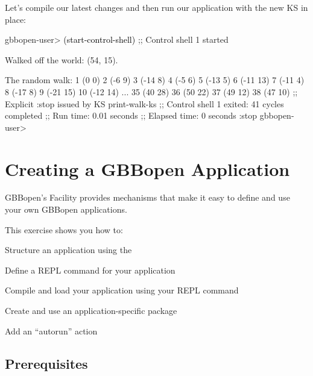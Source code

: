 \documentclass[10pt,twoside,english,pdftex]{article}
\begin{document}
Let's compile our latest changes and then run our application with the new
 KS in place:
%
\W\supp
\begin{example}
\textcolor{darkergray}{%
  gbbopen-user> \textcolor{black}{(start-control-shell)}
  ;; Control shell 1 started

  Walked off the world: (54, 15).

  The random walk:
  1 (0 0)
  2 (-6 9)
  3 (-14 8)
  4 (-5 6)
  5 (-13 5)
  6 (-11 13)
  7 (-11 4)
  8 (-17 8)
  9 (-21 15)
  10 (-12 14)
       ...
  35 (40 28)
  36 (50 22)
  37 (49 12)
  38 (47 10)
  ;; Explicit :stop issued by KS print-walk-ks
  ;; Control shell 1 exited: 41 cycles completed
  ;; Run time: 0.01 seconds
  ;; Elapsed time: 0 seconds
  :stop
  gbbopen-user>}
\end{example}


\T\markright{}%
\T\pagestyle{plain}
\T\cleardoublepage
\W{}
\T\pagestyle{fancy}
\T\thispagestyle{fancybottom}
\T\renewcommand{\headrulewidth}{0pt}
\section{Creating a GBBopen Application}
\label{sec:application}%

GBBopen's  Facility provides
mechanisms that make it easy to define and use your own GBBopen applications.

\fndocrule

This exercise shows you how to:
\begin{tightitemize}
\item Structure an application using the 
\item Define a REPL command for your application
\item Compile and load your application using your REPL command
\item Create and use an application-specific package
\item Add an ``autorun'' action
\end{tightitemize}

\fndocrule

\subsection*{Prerequisites}
\end{document}

